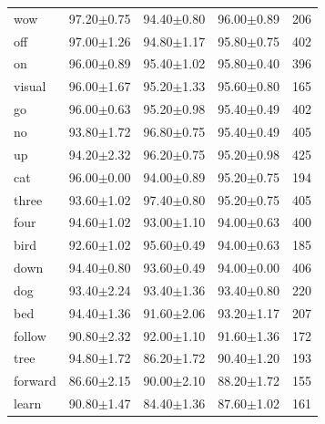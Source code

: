 \begin{table}[h!]
\begin{tabular}{lcccc}
		wow       &  97.20$\pm$0.75 &  94.40$\pm$0.80 &  96.00$\pm$0.89 &     206 \\
		off       &  97.00$\pm$1.26 &  94.80$\pm$1.17 &  95.80$\pm$0.75 &     402 \\
		on        &  96.00$\pm$0.89 &  95.40$\pm$1.02 &  95.80$\pm$0.40 &     396 \\
		visual    &  96.00$\pm$1.67 &  95.20$\pm$1.33 &  95.60$\pm$0.80 &     165 \\
		go        &  96.00$\pm$0.63 &  95.20$\pm$0.98 &  95.40$\pm$0.49 &     402 \\
		no        &  93.80$\pm$1.72 &  96.80$\pm$0.75 &  95.40$\pm$0.49 &     405 \\
		up        &  94.20$\pm$2.32 &  96.20$\pm$0.75 &  95.20$\pm$0.98 &     425 \\
		cat       &  96.00$\pm$0.00 &  94.00$\pm$0.89 &  95.20$\pm$0.75 &     194 \\
		three     &  93.60$\pm$1.02 &  97.40$\pm$0.80 &  95.20$\pm$0.75 &     405 \\
		four      &  94.60$\pm$1.02 &  93.00$\pm$1.10 &  94.00$\pm$0.63 &     400 \\
		bird      &  92.60$\pm$1.02 &  95.60$\pm$0.49 &  94.00$\pm$0.63 &     185 \\
		down      &  94.40$\pm$0.80 &  93.60$\pm$0.49 &  94.00$\pm$0.00 &     406 \\
		dog       &  93.40$\pm$2.24 &  93.40$\pm$1.36 &  93.40$\pm$0.80 &     220 \\
		bed       &  94.40$\pm$1.36 &  91.60$\pm$2.06 &  93.20$\pm$1.17 &     207 \\
		follow    &  90.80$\pm$2.32 &  92.00$\pm$1.10 &  91.60$\pm$1.36 &     172 \\
		tree      &  94.80$\pm$1.72 &  86.20$\pm$1.72 &  90.40$\pm$1.20 &     193 \\
		forward   &  86.60$\pm$2.15 &  90.00$\pm$2.10 &  88.20$\pm$1.72 &     155 \\
		learn     &  90.80$\pm$1.47 &  84.40$\pm$1.36 &  87.60$\pm$1.02 &     161 \\
		\bottomrule
	\end{tabular}

\end{table}







